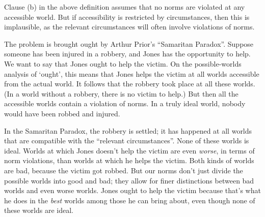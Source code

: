 


Clause (b) in the above definition assumes that no norms are violated at any
accessible world. But if accessibility is restricted by circumstances, then this
is implausible, as the relevant circumstances will often involve violations of
norms.

The problem is brought ought by Arthur Prior's ``Samaritan Paradox''.  Suppose
someone has been injured in a robbery, and Jones has the opportunity to help. We
want to say that Jones ought to help the victim. On the possible-worlds analysis
of `ought', this means that Jones helps the victim at all worlds accessible from
the actual world. It follows that the robbery took place at all these
worlds. (In a world without a robbery, there is no victim to help.)  But then
all the accessible worlds contain a violation of norms. In a truly ideal world,
nobody would have been robbed and injured.

In the Samaritan Paradox, the robbery is settled; it has happened at all worlds
that are compatible with the ``relevant circumstances''. None of these worlds is
ideal. Worlds at which Jones doesn't help the victim are even \emph{worse}, in
terms of norm violations, than worlds at which he helps the victim. Both kinds
of worlds are bad, because the victim got robbed. But our norms don't just
divide the possible worlds into good and bad; they allow for finer distinctions
between bad worlds and even worse worlds. Jones ought to help the victim because
that's what he does in the \emph{best} worlds among those he can bring about,
even though none of these worlds are ideal.

